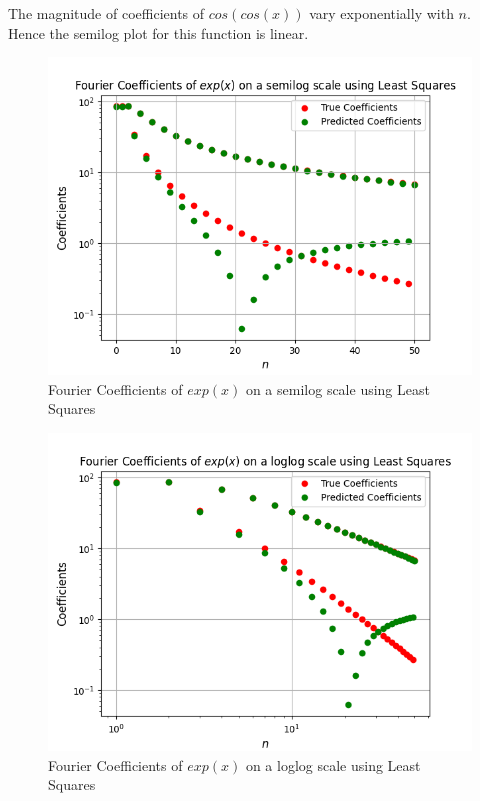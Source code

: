 \documentclass{article}
\begin{document}
The magnitude of coefficients of $cos(cos(x))$ vary exponentially with $n$. Hence the semilog plot for this function is linear.
\begin{figure}[h]
    \centering
    \includegraphics[scale = 0.4]{Figure_7.png}
    \caption{Fourier Coefficients of $exp(x)$ on a semilog scale using Least Squares}
    \label{fig:my_label}
\end{figure}
\begin{figure}
    \centering
    \includegraphics[scale = 0.4]{Figure_8.png}
    \caption{Fourier Coefficients of $exp(x)$ on a loglog scale using Least Squares}
    \label{fig:my_label}
\end{figure}
\end{document}
